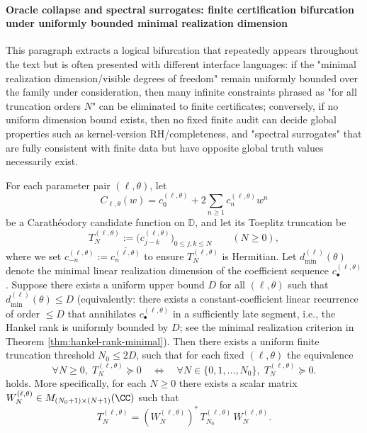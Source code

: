 \paragraph{Oracle collapse and spectral surrogates: finite certification bifurcation under uniformly bounded minimal realization dimension}
This paragraph extracts a logical bifurcation that repeatedly appears throughout the text but is often presented with different interface languages: if the "minimal realization dimension/visible degrees of freedom" remain uniformly bounded over the family under consideration, then many infinite constraints phrased as "for all truncation orders \(N\)" can be eliminated to finite certificates; conversely, if no uniform dimension bound exists, then no fixed finite audit can decide global properties such as kernel-version RH/completeness, and "spectral surrogates" that are fully consistent with finite data but have opposite global truth values necessarily exist.

\begin{theorem}[Oracle collapse: uniformly bounded minimal realization dimension \texorpdfstring{$\Longrightarrow$}{=>} finite truncation of Toeplitz--PSD]\label{thm:xi-oracle-collapse-toeplitz-psd-finite-truncation}
For each parameter pair \((\ell,\theta)\), let
\[
C_{\ell,\theta}(w)=c^{(\ell,\theta)}_0+2\sum_{n\ge 1}c^{(\ell,\theta)}_n w^n
\]
be a Carath\'eodory candidate function on \(\mathbb D\), and let its Toeplitz truncation be
\[
T^{(\ell,\theta)}_N:=\bigl(c^{(\ell,\theta)}_{j-k}\bigr)_{0\le j,k\le N}\qquad(N\ge 0),
\]
where we set \(c^{(\ell,\theta)}_{-n}:=\overline{c^{(\ell,\theta)}_n}\) to ensure \(T^{(\ell,\theta)}_N\) is Hermitian.
Let \(d_{\min}^{(\ell)}(\theta)\) denote the minimal linear realization dimension of the coefficient sequence \(c^{(\ell,\theta)}_\bullet\).
Suppose there exists a uniform upper bound \(D\) for all \((\ell,\theta)\) such that \(d_{\min}^{(\ell)}(\theta)\le D\)
(equivalently: there exists a constant-coefficient linear recurrence of order \(\le D\) that annihilates \(c^{(\ell,\theta)}_\bullet\) in a sufficiently late segment, i.e., the Hankel rank is uniformly bounded by \(D\); see the minimal realization criterion in Theorem \ref{thm:hankel-rank-minimal}).
Then there exists a uniform finite truncation threshold \(N_0\le 2D\), such that for each fixed \((\ell,\theta)\) the equivalence
\[
\forall N\ge 0,\;T^{(\ell,\theta)}_N\succeq 0
\quad\Longleftrightarrow\quad
\forall N\in\{0,1,\dots,N_0\},\;T^{(\ell,\theta)}_N\succeq 0.
\]
holds. More specifically, for each \(N\ge 0\) there exists a scalar matrix \(W^{(\ell,\theta)}_N\in M_{(N_0+1)\times (N+1)}(\CC)\) such that
\[
T^{(\ell,\theta)}_N=(W^{(\ell,\theta)}_N)^\ast\,T^{(\ell,\theta)}_{N_0}\,W^{(\ell,\theta)}_N.
\]
\end{theorem}

